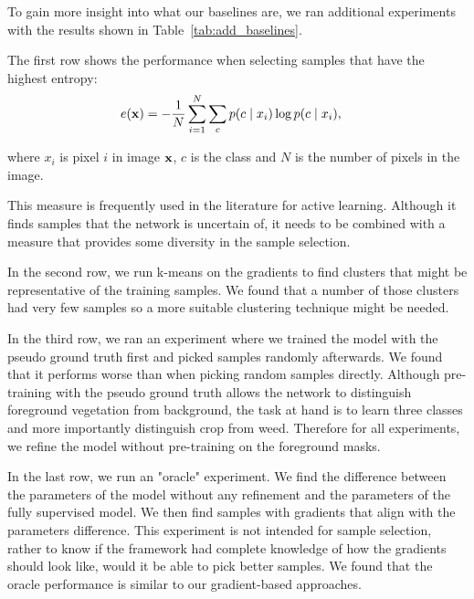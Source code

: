 \documentclass[letterpaper, 10 pt, conference]{ieeeconf}  %
\begin{document}
To gain more insight into what our baselines are, we ran additional experiments with the results shown in Table~\ref{tab:add_baselines}. 

The first row shows the performance when selecting samples that have the highest entropy:
\begin{align}
e(\bold{x}) &= -\frac{1}{N} \sum_{i=1}^N \sum_{c} p(c \mid x_i) \log p(c \mid x_i),
\end{align}  

where $x_i$ is pixel $i$ in image $\bold{x}$, $c$ is the class and $N$ is the number of pixels in the image.

This measure is frequently used in the literature \cite{chakraborty2015active, zhou2017fine} for active learning. Although it finds samples that the network is uncertain of, it needs to be combined with a measure that provides some diversity in the sample selection. 


In the second row, we run k-means on the gradients to find clusters that might be representative of the training samples. We found that a number of those clusters had very few samples so a more suitable clustering technique might be needed. 

In the third row, we ran an experiment where we trained the model with the pseudo ground truth first and picked samples randomly afterwards. We found that it performs worse than when picking random samples directly. Although pre-training with the pseudo ground truth allows the network to distinguish foreground vegetation from background, the task at hand is to learn three classes and more importantly distinguish crop from weed. Therefore for all experiments, we refine the model without pre-training on the foreground masks.

In the last row, we run an "oracle" experiment. We find the difference between the parameters of the model without any refinement and the parameters of the fully supervised model. We then find samples with gradients that align with the parameters difference. This experiment is not intended for sample selection, rather to know if the framework had complete knowledge of how the gradients should look like, would it be able to pick better samples. We found that the oracle performance is similar to our gradient-based approaches.
\end{document}
